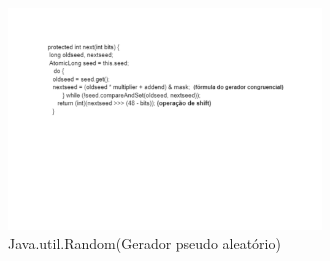\begin{figure}[H]
            \centering
                \includegraphics[width=0.74\textwidth]{codigorandomjava.pdf}
                 \caption{Java.util.Random(Gerador pseudo aleatório)}
                \label{fig:Desempenho}
        \end{figure} 

